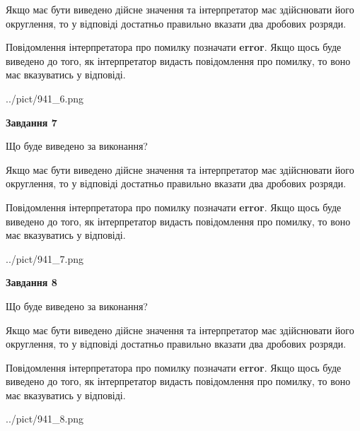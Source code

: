 \documentclass[12pt, ukrainian]{article}
\begin{document}
{\begin {Large}
Якщо має бути виведено дійсне значення та інтерпретатор має здійснювати його округлення, 
то у відповіді достатньо правильно вказати два дробових розряди.

Повідомлення інтерпретатора про помилку позначати \textbf{error}.
Якщо щось буде виведено до того, як інтерпретатор видасть повідомлення про помилку, 
то воно має вказуватись у відповіді. \par

\begin{center}
	{../pict/941_6.png}
\end{center}
\newpage

{\begin {center}\textbf{Завдання 7}\end {center}}\par
Що буде виведено за виконання? \par

Якщо має бути виведено дійсне значення та інтерпретатор має здійснювати його округлення, 
то у відповіді достатньо правильно вказати два дробових розряди.

Повідомлення інтерпретатора про помилку позначати \textbf{error}.
Якщо щось буде виведено до того, як інтерпретатор видасть повідомлення про помилку, 
то воно має вказуватись у відповіді. \par

\begin{center}
	{../pict/941_7.png}
\end{center}
\newpage

{\begin {center}\textbf{Завдання 8}\end {center}}\par
Що буде виведено за виконання? \par

Якщо має бути виведено дійсне значення та інтерпретатор має здійснювати його округлення, 
то у відповіді достатньо правильно вказати два дробових розряди.

Повідомлення інтерпретатора про помилку позначати \textbf{error}.
Якщо щось буде виведено до того, як інтерпретатор видасть повідомлення про помилку, 
то воно має вказуватись у відповіді. \par

\begin{center}
	{../pict/941_8.png}
\end{center}
\newpage


\end{Large}}
\end{document}
